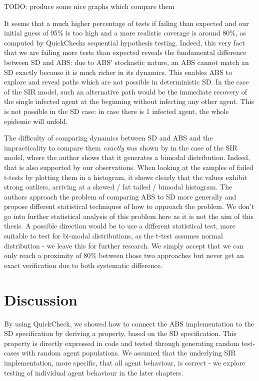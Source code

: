 TODO: produce some nice graphs which compare them 

It seems that a much higher percentage of tests if failing than expected and our initial guess of 95\% is too high and a more realistic coverage is around 80\%, as computed by QuickChecks sequential hypothesis testing. Indeed, this very fact that we are failing more tests than expected reveals the fundamental difference between SD and ABS: due to ABS' stochastic nature, an ABS cannot match an SD exactly because it is much richer in its dynamics. This enables ABS to explore and reveal paths which are not possible in deterministic SD. In the case of the SIR model, such an alternative path would be the immediate recovery of the single infected agent at the beginning without infecting any other agent. This is not possible in the SD case: in case there is 1 infected agent, the whole epidemic will unfold.

The difficulty of comparing dynamics between SD and ABS and the impracticality to compare them \textit{exactly} was shown by \cite{macal_agent-based_2010} in the case of the SIR model, where the author shows that it generates a bimodal distribution. Indeed, that is also supported by our observations. When looking at the samples of failed t-tests by plotting them in a histogram, it shows clearly that the values exhibit strong outliers, arriving at a skewed / fat tailed / bimodal histogram. %
The authors \cite{figueredo_comparing_2014} approach the problem of comparing ABS to SD more generally and propose different statistical techniques of how to approach the problem.
We don't go into further statistical analysis of this problem here as it is not the aim of this thesis. A possible direction would be to use a different statistical test, more suitable to test for bi-modal distributions, as the t-test assumes normal distribution - we leave this for further research. We simply accept that we can only reach a proximity of 80\% between those two approaches but never get an exact verification due to both systematic difference.

\section{Discussion}
By using QuickCheck, we showed how to connect the ABS implementation to the SD specification by deriving a property, based on the SD specification. This property is directly expressed in code and tested through generating random test-cases with random agent populations. We assumed that the underlying SIR implementation, more specific, that all agent behaviour, is correct - we explore testing of individual agent behaviour in the later chapters.

